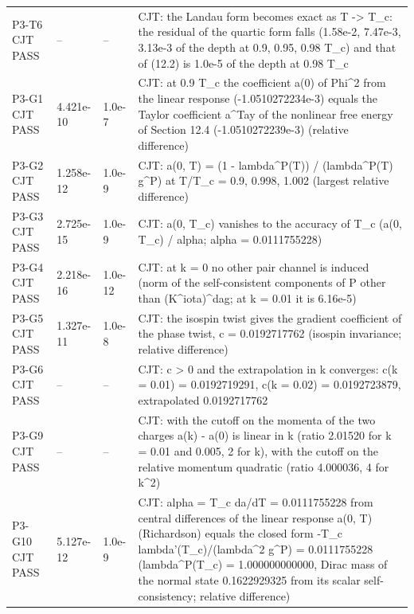 \documentclass[aps,prd,onecolumn,superscriptaddress,nofootinbib,floatfix,longbibliography]{revtex4-2}
\begin{document}
\begin{longtable}{p{}p{}p{}p{}}
P3-T6 CJT \newline PASS & -- & -- & CJT: the Landau form becomes exact as T -\textgreater{} T\_c: the residual of the quartic form falls (1.58e-2, 7.47e-3, 3.13e-3 of the depth at 0.9, 0.95, 0.98 T\_c) and that of (12.2) is 1.0e-5 of the depth at 0.98 T\_c \\
P3-G1 CJT \newline PASS & 4.421e-10 & 1.0e-7 & CJT: at 0.9 T\_c the coefficient a(0) of \textbar{}Phi\textbar{}\textasciicircum{}2 from the linear response (-1.0510272234e-3) equals the Taylor coefficient a\textasciicircum{}Tay of the nonlinear free energy of Section 12.4 (-1.0510272239e-3) (relative difference) \\
P3-G2 CJT \newline PASS & 1.258e-12 & 1.0e-9 & CJT: a(0, T) = (1 - lambda\textasciicircum{}P(T)) / (lambda\textasciicircum{}P(T) g\textasciicircum{}P) at T/T\_c = 0.9, 0.998, 1.002 (largest relative difference) \\
P3-G3 CJT \newline PASS & 2.725e-15 & 1.0e-9 & CJT: a(0, T\_c) vanishes to the accuracy of T\_c (\textbar{}a(0, T\_c)\textbar{} / alpha; alpha = 0.0111755228) \\
P3-G4 CJT \newline PASS & 2.218e-16 & 1.0e-12 & CJT: at k = 0 no other pair channel is induced (norm of the self-consistent components of P other than (K\textasciicircum{}iota)\textasciicircum{}dag; at k = 0.01 it is 6.16e-5) \\
P3-G5 CJT \newline PASS & 1.327e-11 & 1.0e-8 & CJT: the isospin twist gives the gradient coefficient of the phase twist, c = 0.0192717762 (isospin invariance; relative difference) \\
P3-G6 CJT \newline PASS & -- & -- & CJT: c \textgreater{} 0 and the extrapolation in k converges: c(k = 0.01) = 0.0192719291, c(k = 0.02) = 0.0192723879, extrapolated 0.0192717762 \\
P3-G9 CJT \newline PASS & -- & -- & CJT: with the cutoff on the momenta of the two charges a(k) - a(0) is linear in \textbar{}k\textbar{} (ratio 2.01520 for k = 0.01 and 0.005, 2 for \textbar{}k\textbar{}), with the cutoff on the relative momentum quadratic (ratio 4.000036, 4 for k\textasciicircum{}2) \\
P3-G10 CJT \newline PASS & 5.127e-12 & 1.0e-9 & CJT: alpha = T\_c da/dT = 0.0111755228 from central differences of the linear response a(0, T) (Richardson) equals the closed form -T\_c lambda'(T\_c)/(lambda\textasciicircum{}2 g\textasciicircum{}P) = 0.0111755228 (lambda\textasciicircum{}P(T\_c) = 1.000000000000, Dirac mass of the normal state 0.1622929325 from its scalar self-consistency; relative difference) \\

\end{longtable}
\end{document}

